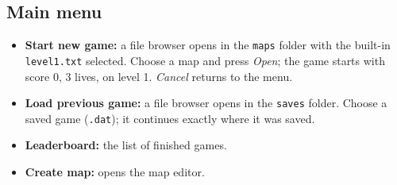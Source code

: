 \documentclass[11pt, a4paper]{article}
\begin{document}
\subsection*{Main menu}
\begin{itemize}
    \item \textbf{Start new game:} a file browser opens in the \texttt{maps} folder with the built-in \texttt{level1.txt} selected. Choose a map and press \textit{Open}; the game starts with score 0, 3 lives, on level 1. \textit{Cancel} returns to the menu.
    \item \textbf{Load previous game:} a file browser opens in the \texttt{saves} folder. Choose a saved game (\texttt{.dat}); it continues exactly where it was saved.
    \item \textbf{Leaderboard:} the list of finished games.
    \item \textbf{Create map:} opens the map editor.
\end{itemize}
\end{document}
